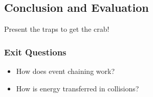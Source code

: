 \documentclass{lessonplan}
\begin{document}
    \subsection{Conclusion and Evaluation}
      Present the traps to get the crab! 
      \subsubsection{Exit Questions}
      \begin{itemize}
        \item How does event chaining work?
		\item How is energy transferred in collisions?
      \end{itemize}
\end{document}
